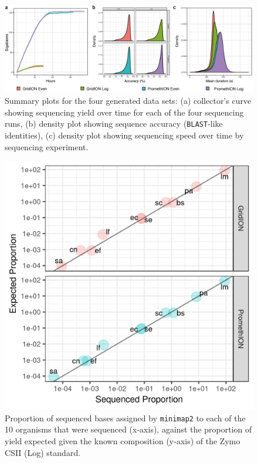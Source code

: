 \documentclass[a4paper,num-refs]{oup-contemporary}
\begin{document}
\begin{figure}[t!] 
\centering
\includegraphics[width=0.975\linewidth]{figures/Qual.png}
\caption{
Summary plots for the four generated data sets:
(a) collector's curve showing sequencing yield over time for each of the four sequencing runs,
(b) density plot showing sequence accuracy (\texttt{BLAST}-like identities),
(c) density plot showing sequencing speed over time by sequencing experiment.
}\label{fig:summaries}
\end{figure}
\begin{figure}[b!]
\centering
\includegraphics[width=0.905\linewidth]{figures/log-ove.png}
\caption{Proportion of sequenced bases assigned by \texttt{minimap2} to each of the 10 organisms that were sequenced (x-axis), against the proportion of yield expected given the known composition (y-axis) of the Zymo CSII (Log) standard.}\label{fig:log-ove}
\end{figure}
\end{document}

